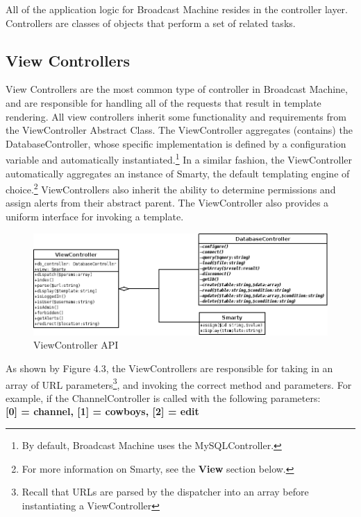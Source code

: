\documentclass[a4paper,12pt]{report}
\begin{document}
All of the application logic for Broadcast Machine resides in the controller layer. Controllers are classes of objects that perform a set of related tasks. 

\subsection*{View Controllers}
View Controllers are the most common type of controller in Broadcast Machine, and are responsible for handling all of the requests that result in template rendering. All view controllers inherit some functionality and requirements from the ViewController Abstract Class. The ViewController aggregates (contains) the DatabaseController, whose specific implementation is defined by a configuration variable and automatically instantiated.\footnote{By default, Broadcast Machine uses the MySQLController.} In a similar fashion, the ViewController automatically aggregates an instance of Smarty, the default templating engine of choice.\footnote{For more information on Smarty, see the \textbf{View} section below.} ViewControllers also inherit the ability to determine permissions and assign alerts from their abstract parent. The ViewController also provides a uniform interface for invoking a template.

\begin{figure}[htp]
\begin{center}
\includegraphics[scale=0.5]{./images/controllers.png}
\end{center}
\caption{ViewController API}
\end{figure}

As shown by Figure 4.3, the ViewControllers are responsible for taking in an array of URL parameters\footnote{Recall that URLs are parsed by the dispatcher into an array before instantiating a ViewController}, and invoking the correct method and parameters. For example, if the ChannelController is called with the following parameters: \\

\textbf{[0] = channel, [1] = cowboys, [2] = edit} \\
\end{document}
